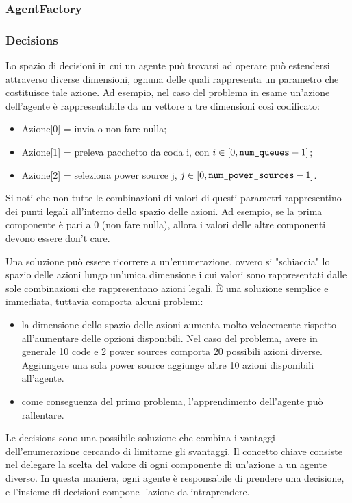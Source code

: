\documentclass[conference]{IEEEtran}
\begin{document}
\subsubsection{AgentFactory}

\subsubsection{Decisions}
Lo spazio di decisioni in cui un agente può trovarsi ad operare può estendersi
attraverso
diverse dimensioni, ognuna delle quali rappresenta un parametro che costituisce
tale azione. Ad esempio, nel caso del problema in esame un'azione dell'agente è
rappresentabile da un vettore a tre dimensioni così codificato:
\begin{itemize}
\item Azione[0] = invia o non fare nulla;
\item Azione[1] = preleva pacchetto da coda i, con $i \in [0, \texttt{num\_queues} - 1]$;
\item Azione[2] = seleziona power source j, $j \in [0, \texttt{num\_power\_sources} - 1]$.
\end{itemize}
Si noti che non tutte le combinazioni di valori di questi parametri
rappresentino dei punti legali all'interno dello spazio delle azioni.
Ad esempio, se la prima componente è pari a 0 (non fare nulla), allora i valori delle
altre componenti devono essere don't care.

Una soluzione può essere ricorrere a un'enumerazione, ovvero si "schiaccia"
lo spazio delle azioni lungo un'unica dimensione i cui valori sono rappresentati 
dalle sole combinazioni che rappresentano azioni legali. È una soluzione semplice e
immediata, tuttavia comporta alcuni problemi:
\begin{itemize}
    \item la dimensione dello spazio delle azioni aumenta molto velocemente rispetto
    all'aumentare delle opzioni disponibili. Nel caso del problema, avere in generale
    10 code e 2 power sources comporta 20 possibili azioni diverse. Aggiungere una
    sola power source aggiunge altre 10 azioni disponibili all'agente.
    \item come conseguenza del primo problema, l'apprendimento dell'agente può
    rallentare. %
\end{itemize}
Le decisions sono una possibile soluzione che combina i vantaggi dell'enumerazione
cercando di limitarne gli svantaggi. Il concetto chiave consiste nel delegare la scelta
del valore di ogni componente di un'azione a un agente diverso. In questa maniera,
ogni agente è responsabile di prendere una decisione, e l'insieme di decisioni compone
l'azione da intraprendere. 
\end{document}
